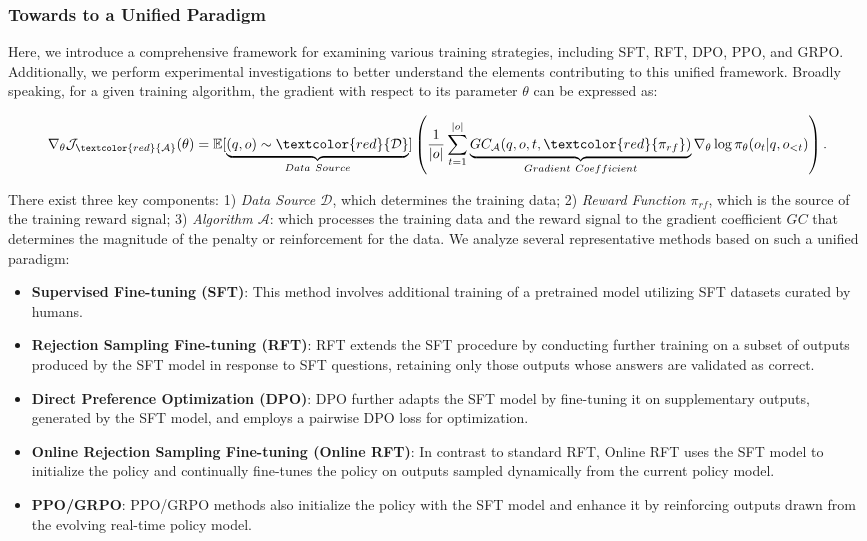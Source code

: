 \begin{itemize}[topsep=0pt]
\begin{itemize}[topsep=0pt]
\subsubsection{Towards to a Unified Paradigm} Here, we introduce a comprehensive framework for examining various training strategies, including SFT, RFT, DPO, PPO, and GRPO. Additionally, we perform experimental investigations to better understand the elements contributing to this unified framework. Broadly speaking, for a given training algorithm, the gradient with respect to its parameter $\theta$ can be expressed as:

\begin{equation}
    \nabla_{\theta}\mathcal{J}_{\textcolor{red}{\mathcal{A}}}(\theta) = \mathbb{E}[\underbrace{(q,o) \sim \textcolor{red}{\mathcal{D}}}_{Data \ Source}]\left( \frac{1}{|o|} \sum_{t=1}^{|o|}  \underbrace{GC_{{\mathcal{A}}}(q, o, t, \textcolor{red}{\pi_{{rf}}})}_{Gradient \ Coefficient}  \nabla_{\theta}\log \pi_{\theta}(o_t | q, o_{<t})\right).
\label{eq:objective}
\end{equation}

There exist three key components: 1) \textit{Data Source $\mathcal{D}$}, which determines the training data; 2) \textit{Reward Function $\pi_{{rf}}$}, which is the source of the training reward signal; 3) \textit{Algorithm $\mathcal{A}$}: which processes the training data and the reward signal to the gradient coefficient $GC$ that determines the magnitude of the penalty or reinforcement for the data. We analyze several representative methods based on such a unified paradigm:

\begin{itemize}
    \item \textbf{Supervised Fine-tuning (SFT)}: This method involves additional training of a pretrained model utilizing SFT datasets curated by humans.
    \item \textbf{Rejection Sampling Fine-tuning (RFT)}: RFT extends the SFT procedure by conducting further training on a subset of outputs produced by the SFT model in response to SFT questions, retaining only those outputs whose answers are validated as correct.
    \item \textbf{Direct Preference Optimization (DPO)}: DPO further adapts the SFT model by fine-tuning it on supplementary outputs, generated by the SFT model, and employs a pairwise DPO loss for optimization.
    \item \textbf{Online Rejection Sampling Fine-tuning (Online RFT)}: In contrast to standard RFT, Online RFT uses the SFT model to initialize the policy and continually fine-tunes the policy on outputs sampled dynamically from the current policy model.
    \item \textbf{PPO/GRPO}: PPO/GRPO methods also initialize the policy with the SFT model and enhance it by reinforcing outputs drawn from the evolving real-time policy model.
\end{itemize}


\end{itemize}
\end{itemize}
